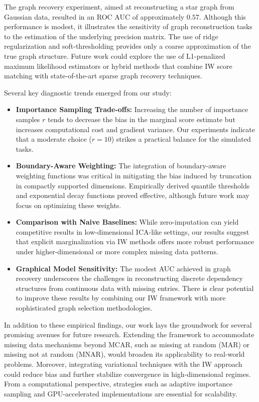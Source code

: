\documentclass{article}
\begin{document}
The graph recovery experiment, aimed at reconstructing a star graph from Gaussian data, resulted in an ROC AUC of approximately $0.57$. Although this performance is modest, it illustrates the sensitivity of graph reconstruction tasks to the estimation of the underlying precision matrix. The use of ridge regularization and soft-thresholding provides only a coarse approximation of the true graph structure. Future work could explore the use of L1-penalized maximum likelihood estimators or hybrid methods that combine IW score matching with state-of-the-art sparse graph recovery techniques.

Several key diagnostic trends emerged from our study:
\begin{itemize}
    \item \textbf{Importance Sampling Trade-offs:} Increasing the number of importance samples $r$ tends to decrease the bias in the marginal score estimate but increases computational cost and gradient variance. Our experiments indicate that a moderate choice ($r=10$) strikes a practical balance for the simulated tasks.
    \item \textbf{Boundary-Aware Weighting:} The integration of boundary-aware weighting functions was critical in mitigating the bias induced by truncation in compactly supported dimensions. Empirically derived quantile thresholds and exponential decay functions proved effective, although future work may focus on optimizing these weights.
    \item \textbf{Comparison with Naive Baselines:} While zero-imputation can yield competitive results in low-dimensional ICA-like settings, our results suggest that explicit marginalization via IW methods offers more robust performance under higher-dimensional or more complex missing data patterns.
    \item \textbf{Graphical Model Sensitivity:} The modest AUC achieved in graph recovery underscores the challenges in reconstructing discrete dependency structures from continuous data with missing entries. There is clear potential to improve these results by combining our IW framework with more sophisticated graph selection methodologies.
\end{itemize}

In addition to these empirical findings, our work lays the groundwork for several promising avenues for future research. Extending the framework to accommodate missing data mechanisms beyond MCAR, such as missing at random (MAR) or missing not at random (MNAR), would broaden its applicability to real-world problems. Moreover, integrating variational techniques with the IW approach could reduce bias and further stabilize convergence in high-dimensional regimes. From a computational perspective, strategies such as adaptive importance sampling and GPU-accelerated implementations are essential for scalability.
\end{document}
